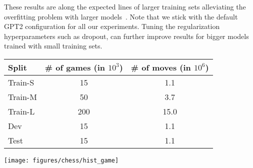 \documentclass[12pt]{thesis-umich}[thesis]
\begin{document}
These results are along the expected lines of larger training sets alleviating the overfitting problem with larger models~\citep{kaplan2020scaling}.  
Note that we stick with the default GPT2 configuration for all our experiments. Tuning the regularization hyperparameters such as dropout, can further improve results for bigger models trained with small training sets. 






 


\begin{figure*}
\begin{minipage}{\textwidth}
	\begin{minipage}[b]{0.5\textwidth}
		\setlength\tabcolsep{4pt}
		\begin{tabular}{lcc}
			\toprule
			Split & \# of games (in $10^3$) & \# of moves (in $10^6$)\\ \midrule
			Train-S & 	\phantom{1}15 	& \phantom{1}1.1\\ Train-M & 	\phantom{1}50 	& \phantom{1}3.7\\ Train-L & 	200 			& 15.0\\ 			 Dev 	& 	\phantom{1}15 	& \phantom{1}1.1\\ Test 	& 	\phantom{1}15 	& \phantom{1}1.1\\ \bottomrule
		\end{tabular}
		\label{tab:data_stats}
	\end{minipage}
	\hfill
	\begin{minipage}[b]{0.48\textwidth}
		\centering
		\texttt{[image: figures/chess/hist\_game]}
		\vspace{-0.1in}
		\label{fig:hist_len}
	\end{minipage}
\end{minipage}
\end{figure*}
\end{document}

